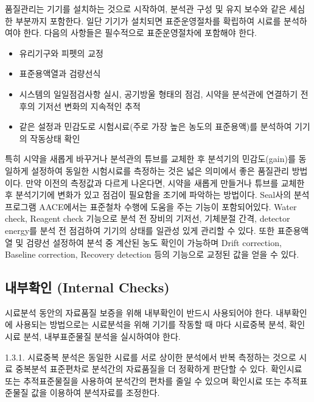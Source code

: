\documentclass[
]{book}
\providecommand{\tightlist}{%
  \setlength{\itemsep}{0pt}\setlength{\parskip}{0pt}}
\begin{document}
품질관리는 기기를 설치하는 것으로 시작하여, 분석관 구성 및 유지 보수와 같은 세심한 부분까지 포함한다. 일단 기기가 설치되면 표준운영절차를 확립하여 시료를 분석하여야 한다. 다음의 사항들은 필수적으로 표준운영절차에 포함해야 한다.

\begin{itemize}
\tightlist
\item
  유리기구와 피펫의 교정\\
\item
  표준용액열과 검량선식\\
\item
  시스템의 일일점검사항 실시, 공기방울 형태의 점검, 시약을 분석관에 연결하기 전후의 기저선 변화의 지속적인 추적\\
\item
  같은 설정과 민감도로 시험시료(주로 가장 높은 농도의 표준용액)를 분석하여 기기의 작동상태 확인
\end{itemize}

특히 시약을 새롭게 바꾸거나 분석관의 튜브를 교체한 후 분석기의 민감도(gain)를 동일하게 설정하여 동일한 시험시료를 측정하는 것은 넓은 의미에서 좋은 품질관리 방법이다. 만약 이전의 측정값과 다르게 나온다면, 시약을 새롭게 만들거나 튜브를 교체한 후 분석기기에 변화가 있고 점검이 필요함을 조기에 파악하는 방법이다.
Seal사의 분석 프로그램 AACE에서는 표준철차 수행에 도움을 주는 기능이 포함되어있다. Water check, Reagent check 기능으로 분석 전 장비의 기저선, 기체분절 간격, detector energy를 분석 전 점검하여 기기의 상태를 일관성 있게 관리할 수 있다. 또한 표준용액열 및 검량선 설정하여 분석 중 계산된 농도 확인이 가능하며 Drift correction, Baseline correction, Recovery detection 등의 기능으로 교정된 값을 얻을 수 있다.

\hypertarget{uxb0b4uxbd80uxd655uxc778-internal-checks-1}{%
\subsection{내부확인 (Internal Checks)}\label{uxb0b4uxbd80uxd655uxc778-internal-checks-1}}

시료분석 동안의 자료품질 보증을 위해 내부확인이 반드시 사용되어야 한다. 내부확인에 사용되는 방법으로는 시료분석을 위해 기기를 작동할 때 마다 시료중복 분석, 확인시료 분석, 내부표준물질 분석을 실시하여야 한다.

1.3.1. 시료중복 분석은 동일한 시료를 서로 상이한 분석에서 반복 측정하는 것으로 시료 중복분석 표준편차로 분석간의 자료품질을 더 정확하게 판단할 수 있다. 확인시료 또는 추적표준물질을 사용하여 분석간의 편차를 줄일 수 있으며 확인시료 또는 추적표준물질 값을 이용하여 분석자료를 조정한다.
\end{document}
